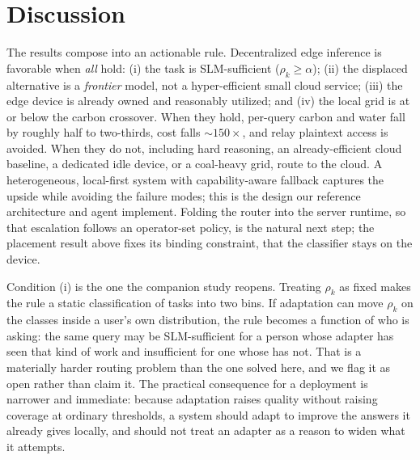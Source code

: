 \documentclass[conference]{IEEEtran}
\begin{document}
\section{Discussion}
The results compose into an actionable rule. Decentralized edge inference is
favorable when \emph{all} hold: (i) the task is SLM-sufficient
($\rho_k\ge\alpha$); (ii) the displaced alternative is a \emph{frontier} model,
not a hyper-efficient small cloud service; (iii) the edge device is already owned
and reasonably utilized; and (iv) the local grid is at or below the carbon
crossover. When they hold, per-query carbon and water fall by roughly half to
two-thirds, cost falls $\sim$$150\times$, and relay plaintext access is avoided.
When they do
not, including hard reasoning, an already-efficient cloud baseline, a dedicated
idle device, or a coal-heavy grid, route to the cloud. A heterogeneous, local-first
system with capability-aware fallback \cite{belcak2025} captures the upside while
avoiding the failure modes; this is the design our reference architecture and
agent implement. Folding the router into the server runtime, so that
escalation follows an operator-set policy, is the natural next step; the
placement result above fixes its binding constraint, that the classifier stays
on the device.

Condition (i) is the one the companion study \cite{autoyou2026adaptation}
reopens. Treating $\rho_k$ as fixed makes the rule a static classification of
tasks into two bins. If adaptation can move $\rho_k$ on the classes inside a
user's own distribution, the rule becomes a function of who is asking: the same
query may be SLM-sufficient for a person whose adapter has seen that kind of
work and insufficient for one whose has not. That is a materially harder routing
problem than the one solved here, and we flag it as open rather than claim it.
The practical consequence for a deployment is narrower and immediate: because
adaptation raises quality without raising coverage at ordinary thresholds, a
system should adapt to improve the answers it already gives locally, and should
not treat an adapter as a reason to widen what it attempts.
\end{document}
